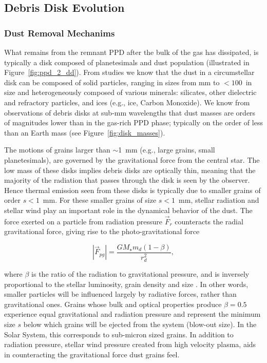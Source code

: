         
    \subsection{Debris Disk Evolution}\label{sec:debrisdisk_phase}
    
    \subsubsection{Dust Removal Mechanims}
    What remains from the remnant PPD after the bulk of the gas has dissipated, is typically a disk composed of planetesimals and dust population (illustrated in Figure~\ref{fig:ppd_2_dd}). From studies \citep[e.g.,][]{Lisse2009, Lisse2012, deVries2012, Rodigas2015} we know that the dust in a circumstellar disk can be composed of solid particles, ranging in sizes from mm to $<100$\micron\ in size and heterogeneously composed of various minerals: silicates, other dielectric and refractory particles, and ices (e.g., ice, Carbon Monoxide). We know from observations of debris disks at sub-mm wavelengths that dust masses are orders of magnitudes lower than in the gas-rich PPD phase; typically on the order of less than an Earth mass (see Figure~\ref{fig:disk_masses}). 

    The motions of grains larger than $\sim$1~mm (e.g., large grains, small planetesimals), are governed by the gravitational force from the central star. The low mass of these disks implies  debris disks are optically thin, meaning that the majority of the radiation that passes through the disk is seen by the observer. Hence thermal emission seen from these disks is typically due to smaller grains of order $s<1$~mm. For these smaller grains of size $s<1$~mm, stellar radiation and stellar wind play an important role in the dynamical behavior of the dust. The force exerted on a particle from radiation pressure $\vec{F}_r$ counteracts the radial gravitational force, giving rise to the photo-gravitational force
    
    \begin{equation}\label{eq:photograv_force}
    \left|\vec{F}_{pg}\right|= \frac{GM_\star m_d(1-\beta)}{r_d^2},
    \end{equation}
    
    \noindent where $\beta$ is the ratio of the radiation to gravitational pressure, and is inversely proportional to the stellar luminosity, grain density and size \citep{Burns1979}. In other words, smaller particles will be influenced largely by radiative forces, rather than gravitational ones. Grains whose bulk and optical properties produce $\beta=0.5$ experience equal gravitational and radiation pressure and represent the minimum size $s$ below which grains will be ejected from the system (blow-out size). In the Solar System, this corresponds to sub-micron sized grains. In addition to radiation pressure, stellar wind pressure created from high velocity plasma, aids in counteracting the gravitational force dust grains feel. 

